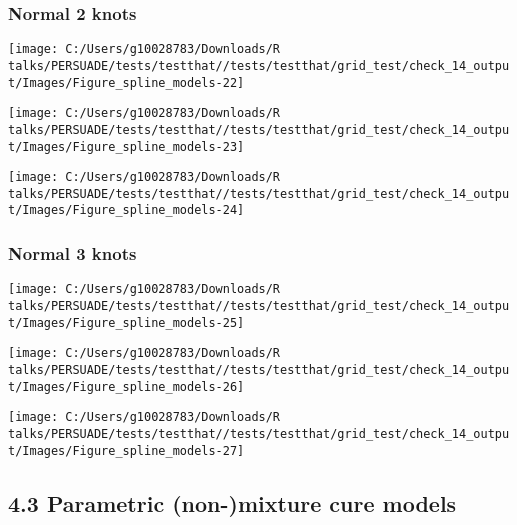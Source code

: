 \documentclass[
]{article}
\begin{document}
\subsubsection{Normal 2 knots}\label{normal-2-knots}

\begin{flushleft}\texttt{[image: C:/Users/g10028783/Downloads/R talks/PERSUADE/tests/testthat//tests/testthat/grid\_test/check\_14\_output/Images/Figure\_spline\_models-22]} \end{flushleft}

\begin{flushleft}\texttt{[image: C:/Users/g10028783/Downloads/R talks/PERSUADE/tests/testthat//tests/testthat/grid\_test/check\_14\_output/Images/Figure\_spline\_models-23]} \end{flushleft}

\begin{flushleft}\texttt{[image: C:/Users/g10028783/Downloads/R talks/PERSUADE/tests/testthat//tests/testthat/grid\_test/check\_14\_output/Images/Figure\_spline\_models-24]} \end{flushleft}

\clearpage

\subsubsection{Normal 3 knots}\label{normal-3-knots}

\begin{flushleft}\texttt{[image: C:/Users/g10028783/Downloads/R talks/PERSUADE/tests/testthat//tests/testthat/grid\_test/check\_14\_output/Images/Figure\_spline\_models-25]} \end{flushleft}

\begin{flushleft}\texttt{[image: C:/Users/g10028783/Downloads/R talks/PERSUADE/tests/testthat//tests/testthat/grid\_test/check\_14\_output/Images/Figure\_spline\_models-26]} \end{flushleft}

\begin{flushleft}\texttt{[image: C:/Users/g10028783/Downloads/R talks/PERSUADE/tests/testthat//tests/testthat/grid\_test/check\_14\_output/Images/Figure\_spline\_models-27]} \end{flushleft}

\clearpage

\subsection{4.3 Parametric (non-)mixture cure
models}\label{parametric-non-mixture-cure-models}
\end{document}
